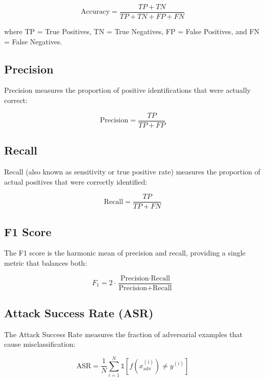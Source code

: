 \documentclass[12pt,a4paper,oneside]{report}
\begin{document}
\begin{equation}
    \label{eq:accuracy}
    \text{Accuracy} = \frac{TP + TN}{TP + TN + FP + FN}
\end{equation}

\noindent where TP = True Positives, TN = True Negatives, FP = False Positives, and FN = False Negatives.

\subsection{Precision}

Precision measures the proportion of positive identifications that were actually correct:

\begin{equation}
    \label{eq:precision}
    \text{Precision} = \frac{TP}{TP + FP}
\end{equation}

\subsection{Recall}

Recall (also known as sensitivity or true positive rate) measures the proportion of actual positives that were correctly identified:

\begin{equation}
    \label{eq:recall}
    \text{Recall} = \frac{TP}{TP + FN}
\end{equation}

\subsection{F1 Score}

The F1 score is the harmonic mean of precision and recall, providing a single metric that balances both:

\begin{equation}
    \label{eq:f1}
    F_1 = 2 \cdot \frac{\text{Precision} \cdot \text{Recall}}{\text{Precision} + \text{Recall}}
\end{equation}

\subsection{Attack Success Rate (ASR)}

The Attack Success Rate measures the fraction of adversarial examples that cause misclassification:

\begin{equation}
    \label{eq:asr}
    \text{ASR} = \frac{1}{N} \sum_{i=1}^{N} \mathbb{1}[f(x_{\text{adv}}^{(i)}) \neq y^{(i)}]
\end{equation}
\end{document}
